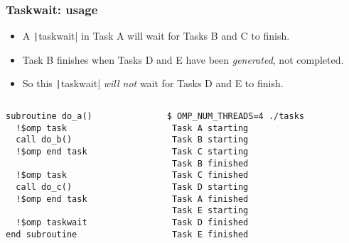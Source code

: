 \documentclass{beamer}
\begin{document}
\begin{frame}[fragile]
\frametitle{Taskwait: usage}

\begin{itemize}
  \item A \texttt|taskwait| in Task A will wait for Tasks B and C to finish.
  \item Task B finishes when Tasks D and E have been \emph{generated}, not completed.
  \item So this \texttt|taskwait| \emph{will not} wait for Tasks D and E to finish.
\end{itemize}

\begin{columns}
\begin{column}{0.5\textwidth}
\begin{verbatim}
subroutine do_a()
  !$omp task
  call do_b()
  !$omp end task

  !$omp task
  call do_c()
  !$omp end task

  !$omp taskwait
end subroutine

\end{verbatim}
\end{column}

\begin{column}{0.5\textwidth}
\begin{verbatim}
$ OMP_NUM_THREADS=4 ./tasks
 Task A starting
 Task B starting
 Task C starting
 Task B finished
 Task C finished
 Task D starting
 Task A finished
 Task E starting
 Task D finished
 Task E finished
\end{verbatim}
\end{column}

\end{columns}
\end{frame}
\end{document}
